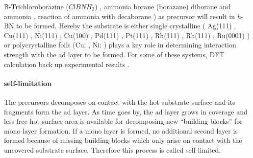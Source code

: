 	B-Trichloroborazine (${ClBNH}_3$) \cite{auwarter_synthesis_2004-1, muller_symmetry_2005}, 
	ammonia borane (borazane) \cite{guo_controllable_2012-4, lee_large-scale_2012, kim_synthesis_2012-1} 
	diborane and ammonia \cite{ismach_toward_2012},
	reaction of ammonia with decaborane \cite{chatterjee_chemical_2011}
	) as precursor will result in \textit{h}-BN to be formed. Hereby the substrate is either single crystalline (
	Ag(111) \cite{muller_epitaxial_2010}, 
	Cu(111) \cite{joshi_boron_2012, schwarz_corrugation_2017, li_grain_2015, preobrajenski_monolayer_2005}, 
	Ni(111) \cite{preobrajenski_monolayer_2005, nagashima_electronic_1995, auwarter_synthesis_2004-1, auwarter_xpd_1999} , 
	Cu(100) \cite{guo_controllable_2012-4}, 
	Pd(111) \cite{nagashima_electronic_1995, morscher_formation_2006}, 
	Pt(111) \cite{nagashima_electronic_1995, preobrajenski_monolayer_2007-1, muller_symmetry_2005}, Rh(111) \cite{corso_boron_2004}, 
	Rh(111) \cite{preobrajenski_monolayer_2007-1},
	Ru(0001) \cite{goriachko_self-assembly_2007, preobrajenski_monolayer_2007-1} ) or polycrystalline foils (Cu: \cite{kidambi_situ_2014, lee_large-scale_2012, kim_synthesis_2012, kim_synthesis_2012-1, ismach_toward_2012, guo_controllable_2012-4, chatterjee_chemical_2011}, Ni: \cite{ismach_toward_2012, chatterjee_chemical_2011}
	) 
	plays a key role in determining interaction strength with the ad layer to be formed. For some of these systems, DFT calculation back up experimental results \cite{gomez_diaz_hexagonal_2013}.
	
	\paragraph{self-limitation}
	The precursors decomposes on contact with the hot substrate surface and its fragments form the ad layer. As time goes by, the ad layer grows in coverage and less free hot surface area is available for decomposing new ``building blocks'' for mono layer formation. If a mono layer is formed, no additional second layer is formed because of missing building blocks which only arise on contact with the uncovered substrate surface. Therefore this process is called self-limited.
	
	
